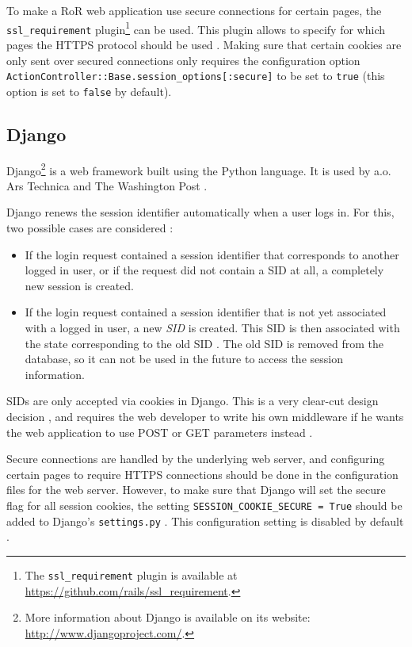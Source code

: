 To make a RoR web application use secure connections for certain pages, the \texttt{ssl\_requirement} plugin\footnote{The \texttt{ssl\_requirement} plugin is available at \url{https://github.com/rails/ssl_requirement}.} can be used. This plugin allows to specify for which pages the HTTPS protocol should be used \cite{Slater2008}. Making sure that certain cookies are only sent over secured connections only requires the configuration option \texttt{ActionController::Base.session\_options[:secure]} to be set to \texttt{true} (this option is set to \texttt{false} by default).

\subsection{Django}

Django\footnote{More information about Django is available on its website: \url{http://www.djangoproject.com/}.} is a web framework built using the Python language. It is used by a.o. Ars Technica and The Washington Post \cite{DjangoPoweredBy}.

Django renews the session identifier automatically when a user logs in. For this, two possible cases are considered \cite{DjangoLoginCode}:
\begin{itemize}
	\item If the login request contained a session identifier that corresponds to another logged in user, or if the request did not contain a SID at all, a completely new session is created.
	\item If the login request contained a session identifier that is not yet associated with a logged in user, a new \emph{SID} is created. This SID is then associated with the state corresponding to the old SID \cite{DjangoSessionsCode}. The old SID is removed from the database, so it can not be used in the future to access the session information.
\end{itemize}

SIDs are only accepted via cookies in Django. This is a very clear-cut design decision \cite{DjangoSessions}, and requires the web developer to write his own middleware if he wants the web application to use POST or GET parameters instead \cite{Fairs2007}.

Secure connections are handled by the underlying web server, and configuring certain pages to require HTTPS connections should be done in the configuration files for the web server. However, to make sure that Django will set the secure flag for all session cookies, the setting \texttt{SESSION\_COOKIE\_SECURE = True} should be added to Django's \texttt{settings.py} \cite{Barnham2009}. This configuration setting is disabled by default \cite{Holovaty2008}.

